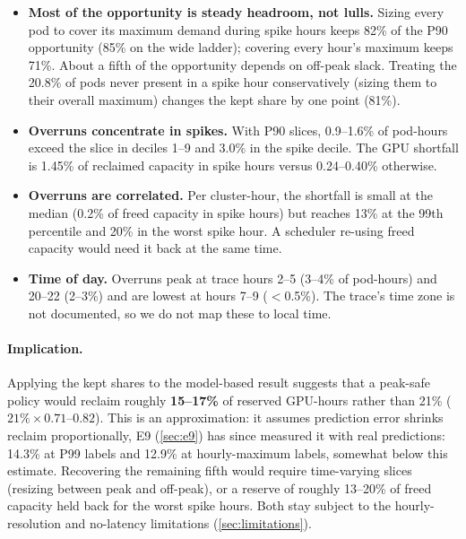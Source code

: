 \begin{itemize}
  \item \textbf{Most of the opportunity is steady headroom, not lulls.} Sizing every pod to cover its maximum demand during spike hours keeps 82\% of the P90 opportunity (85\% on the wide ladder); covering every hour's maximum keeps 71\%. About a fifth of the opportunity depends on off-peak slack. Treating the 20.8\% of pods never present in a spike hour conservatively (sizing them to their overall maximum) changes the kept share by one point (81\%).
  \item \textbf{Overruns concentrate in spikes.} With P90 slices, 0.9--1.6\% of pod-hours exceed the slice in deciles 1--9 and 3.0\% in the spike decile. The GPU shortfall is 1.45\% of reclaimed capacity in spike hours versus 0.24--0.40\% otherwise.
  \item \textbf{Overruns are correlated.} Per cluster-hour, the shortfall is small at the median (0.2\% of freed capacity in spike hours) but reaches 13\% at the 99th percentile and 20\% in the worst spike hour. A scheduler re-using freed capacity would need it back at the same time.
  \item \textbf{Time of day.} Overruns peak at trace hours 2--5 (3--4\% of pod-hours) and 20--22 (2--3\%) and are lowest at hours 7--9 ($<$0.5\%). The trace's time zone is not documented, so we do not map these to local time.
\end{itemize}

\paragraph{Implication.} Applying the kept shares to the model-based result suggests that a peak-safe policy would reclaim roughly \textbf{15--17\%} of reserved GPU-hours rather than 21\% ($21\% \times 0.71$--$0.82$). This is an approximation: it assumes prediction error shrinks reclaim proportionally, E9 (\cref{sec:e9}) has since measured it with real predictions: 14.3\% at P99 labels and 12.9\% at hourly-maximum labels, somewhat below this estimate. Recovering the remaining fifth would require time-varying slices (resizing between peak and off-peak), or a reserve of roughly 13--20\% of freed capacity held back for the worst spike hours. Both stay subject to the hourly-resolution and no-latency limitations (\cref{sec:limitations}).
